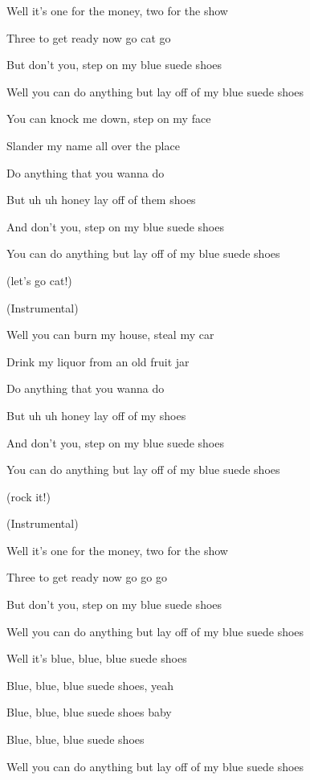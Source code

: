 
\zs
Well it's one for the money,  two for the show

Three to get ready now go cat go

But don't you, step on my blue suede shoes

Well you can do anything but lay off of my blue suede shoes
\ks

\zs
You can knock me down, step on my face

Slander my name all over the place

Do anything that you wanna do

But uh uh honey lay off of them shoes

And don't you, step on my blue suede shoes

You can do anything but lay off of my blue suede shoes

(let's go cat!)
\ks

\zs
(Instrumental)
\ks

\zs
Well you can burn my house, steal my car

Drink my liquor from an old fruit jar

Do anything that you wanna do

But uh uh honey lay off of my shoes

And don't you, step on my blue suede shoes

You can do anything but lay off of my blue suede shoes

(rock it!)
\ks

\zs
(Instrumental)
\ks

\zs
Well it's one for the money,  two for the show

Three to get ready now go go go

But don't you, step on my blue suede shoes

Well you can do anything but lay off of my blue suede shoes
\ks

\zs
Well it's blue, blue, blue suede shoes

Blue, blue, blue suede shoes, yeah

Blue, blue, blue suede shoes baby

Blue, blue, blue suede shoes

Well you can do anything but lay off of my blue suede shoes
\ks

\kp
